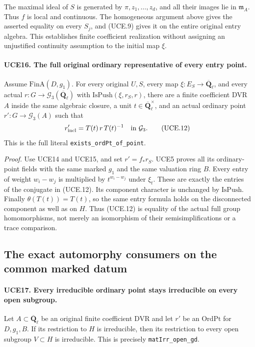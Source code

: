The maximal ideal of \(S\) is generated by \(\pi,z_1,\ldots,z_d\),
and all their images lie in \(\mathfrak m_A\).  Thus \(f\)
is local and continuous.  The homogeneous argument above gives
the asserted equality on every \(S_j\), and (UCE.9) gives it
on the entire original entry algebra.  This establishes finite
coefficient realization without assigning an unjustified
continuity assumption to the initial map \(\xi\).

\paragraph{UCE16. The full original ordinary representative of every entry point.}
\label{claim:UCE16}
Assume \(\mathrm{FinA}(D,g_1)\).  For every original \(U,S\),
every map \(\xi:E_S\to\overline{\mathbf Q}_\ell\), and every
actual \(r:G\to\mathcal G_3(\overline{\mathbf Q}_\ell)\)
with \(\mathrm{IsPush}(\xi,r_S,r)\), there are a finite
coefficient DVR \(A\) inside the same algebraic closure, a unit
\(t\in\overline{\mathbf Q}_\ell^\times\), and an actual
ordinary point \(r':G\to\mathcal G_3(A)\) such that
\[
                    r'_\mathrm{incl}=T(t)\,r\,T(t)^{-1}
                        \quad\hbox{in }\mathcal G_3.
 \tag{UCE.12}
\]
This is the full literal \texttt{exists\_ordPt\_of\_point}.

\emph{Proof.}
Use UCE14 and UCE15, and set \(r'=f_*r_S\).  UCE5 proves
all its ordinary-point fields with the same marked \(g_1\)
and the same valuation ring \(B\).  Every entry of weight
\(w_i-w_j\) is multiplied by \(t^{w_i-w_j}\) under
\(\xi_t\).  These are exactly the entries of the conjugate
in (UCE.12).  Its component character is unchanged by
\(\mathrm{IsPush}\).  Finally \(\theta(T(t))=T(t)\), so
the same entry formula holds on the disconnected component as
well as on \(H\).  Thus (UCE.12) is equality of the actual
full group homomorphisms, not merely an isomorphism of their
semisimplifications or a trace comparison.

\subsection{The exact automorphy consumers on the common marked datum}

\paragraph{UCE17. Every irreducible ordinary point stays irreducible on every open subgroup.}
\label{claim:UCE17}
Let \(A\subset\overline{\mathbf Q}_\ell\) be an original finite
coefficient DVR and let \(r'\) be an \(\mathrm{OrdPt}\) for
\(D,g_1,B\).  If its restriction to \(H\) is irreducible,
then its restriction to every open subgroup \(V\subset H\)
is irreducible.  This is precisely \texttt{matIrr\_open\_gd}.

